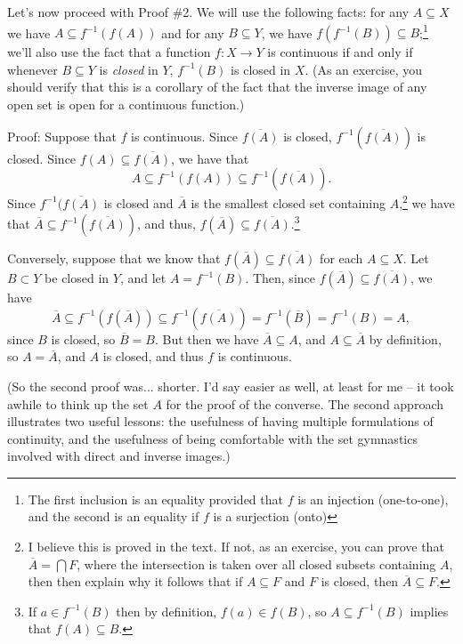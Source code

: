 \documentclass[letterpaper,12pt]{article}
\begin{document}
\begin{enumerate}
\bigskip

Let's now proceed with Proof \#2. We will use the following facts: for any $A\subseteq X$ we have $A\subseteq f^{-1}(f(A))$ and for any $B\subseteq Y$, we have $f(f^{-1}(B))\subseteq B$;\footnote{The first inclusion is an equality provided that $f$ is an injection (one-to-one), and the second is an equality if $f$ is a surjection (onto)} we'll also use the fact that a function $f:X\to Y$ is continuous if and only if whenever $B\subseteq Y$ is {\em closed} in $Y$, $f^{-1}(B)$ is closed in $X$. (As an exercise, you should verify that this is a corollary of the fact that the inverse image of any open set is open for a continuous function.)

Proof: Suppose that $f$ is continuous. Since $\overline{f(A)}$ is closed, $f^{-1}(\overline{f(A)})$ is closed. Since $f(A)\subseteq \overline{f(A)}$, we have that 
\[
A\subseteq f^{-1}(f(A))\subseteq f^{-1}(\overline{f(A)}).
\]
Since $f^{-1}(\overline{f(A)}$ is closed and $\overline{A}$ is the smallest closed set containing $A$,\footnote{I believe this is proved in the text. If not, as an exercise, you can prove that $\overline{A}=\bigcap F$, where the intersection is taken over all closed subsets containing $A$, then then explain why it follows that if $A\subseteq F$ and $F$ is closed, then $\overline{A}\subseteq F$.} we have that
$\overline{A}\subseteq f^{-1}(\overline{f(A)})$,
and thus, $f(\overline{A})\subseteq \overline{f(A)}$.\footnote{If $a\in f^{-1}(B)$ then by definition, $f(a)\in f(B)$, so $A\subseteq f^{-1}(B)$ implies that $f(A)\subseteq B$.}

Conversely, suppose that we know that $f(\overline{A})\subseteq \overline{f(A)}$ for each $A\subseteq X$. Let $B\subset Y$ be closed in $Y$, and let $A=f^{-1}(B)$. Then, since $f(\overline{A})\subseteq \overline{f(A)}$, we have
\[
\overline{A}\subseteq f^{-1}(f(\overline{A}))\subseteq f^{-1}(\overline{f(A)}) = f^{-1}(\overline{B}) = f^{-1}(B) = A,
\] 
since $B$ is closed, so $\overline{B}=B$. But then we have $\overline{A}\subseteq A$, and $A\subseteq \overline{A}$ by definition, so $A=\overline{A}$, and $A$ is closed, and thus $f$ is continuous.

(So the second proof was... shorter. I'd say easier as well, at least for me -- it took awhile to think up the set $A$ for the proof of the converse. The second approach illustrates two useful lessons: the usefulness of having multiple formulations of continuity, and the usefulness of being comfortable with the set gymnastics involved with direct and inverse images.)


\end{enumerate}
\end{document}
